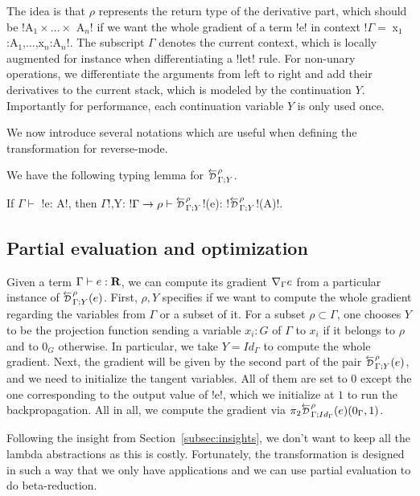 The idea is that $\rho$ represents the return type of the derivative part, which should be !A$_{1} \times \ldots \times$ A$_n$! 
if we want the whole gradient of a term !e! in context !$\Gamma = \;$x$_{1}$:A$_{1}$,$\ldots$,x$_n$:A$_n$!.
The subscript $\Gamma$ denotes the current context, 
which is locally augmented for instance when differentiating a !let! rule.
For non-unary operations, we differentiate the arguments from left to right and add their derivatives to the current stack, 
which is modeled by the continuation $Y$. 
Importantly for performance, each continuation variable $Y$ is only used once.

We now introduce several notations which are useful when defining the transformation for reverse-mode.



We have the following typing lemma for $\directD{\rho}{\Gamma}{Y}$.
\begin{lemma}
    If $\Gamma \vdash$ !e: A!, then $\Gamma$!,Y: !$\Gamma\to \rho \vdash \directD{\rho}{\Gamma}{Y}$!(e): !$\directD{\rho}{\Gamma}{Y}$!(A)!.
\end{lemma}



\subsection{Partial evaluation and optimization} %
\label{sub:Partial evaluation and optimization}

Given a term $\Gamma\vdash e : \mathbf{R}$, we can compute its gradient $\nabla_\Gamma e$ from a particular instance of 
$\directD{\rho}{\Gamma}{Y}(e)$. First, $\rho, Y$ specifies if we want to compute the whole gradient regarding the variables from $\Gamma$ or a subset of it.
For a subset $\rho\subset \Gamma$, one chooses $Y$ to be the projection function sending a variable 
$x_i:G$ of $\Gamma$ to $x_i$ if it belongs to $\rho$ and to $0_G$ otherwise.
In particular, we take $Y=Id_\Gamma$ to compute the whole gradient.
Next, the gradient will be given by the second part of the pair $\directD{\rho}{\Gamma}{Y}(e)$, 
and we need to initialize the tangent variables. All of them are set to $0$ except the one corresponding to the output value of !e!, 
which we initialize at $1$ to run the backpropagation. 
All in all, we compute the gradient via $\pi_2\directD{\rho}{\Gamma}{Id_\Gamma}(e)(0_\Gamma,1)$.

Following the insight from Section~\ref{subsec:insights}, 
we don't want to keep all the lambda abstractions as this is costly. 
Fortunately, the transformation is designed in such a way that we only have applications 
and we can use partial evaluation to do beta-reduction. 

